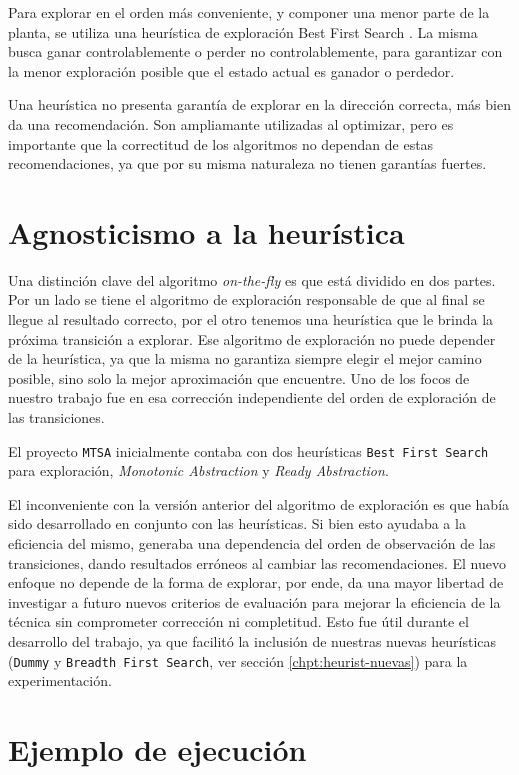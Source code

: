 Para explorar en el orden más conveniente, y componer una menor parte de la planta, se utiliza una heurística de exploración Best First Search \cite{tesisDani}. La misma busca ganar controlablemente o perder no controlablemente, para garantizar con la menor exploración posible que el estado actual es ganador o perdedor.

Una heurística no presenta garantía de explorar en la dirección correcta, más bien da una recomendación. Son ampliamante utilizadas al optimizar, pero es importante que la correctitud de los algoritmos no dependan de estas recomendaciones, ya que por su misma naturaleza no tienen garantías fuertes.

\section{Agnosticismo a la heurística}

Una distinción clave del algoritmo \textit{on-the-fly} es que está dividido en dos partes. Por un lado se tiene el algoritmo de exploración responsable de que al final se llegue al resultado correcto, por el otro tenemos una heurística que le brinda la próxima transición a explorar. Ese algoritmo de exploración no puede depender de la heurística, ya que la misma no garantiza siempre elegir el mejor camino posible, sino solo la mejor aproximación que encuentre. Uno de los focos de nuestro trabajo fue en esa corrección independiente del orden de exploración de las transiciones.

El proyecto \texttt{MTSA} inicialmente contaba con dos heurísticas \texttt{Best First Search} para exploración, \textit{Monotonic Abstraction} y \textit{Ready Abstraction}. 

El inconveniente con la versión anterior del algoritmo de exploración es que había sido desarrollado en conjunto con las heurísticas. Si bien esto ayudaba a la eficiencia del mismo, generaba una dependencia del orden de observación de las transiciones, dando resultados erróneos al cambiar las recomendaciones. El nuevo enfoque no depende de la forma de explorar, por ende, da una mayor libertad de investigar a futuro nuevos criterios de evaluación para mejorar la eficiencia de la técnica sin comprometer corrección ni completitud. Esto fue útil durante el desarrollo del trabajo, ya que facilitó la inclusión de nuestras nuevas heurísticas (\texttt{Dummy} y \texttt{Breadth First Search}, ver sección \ref{chpt:heurist-nuevas}) para la experimentación.


\section{Ejemplo de ejecución}

